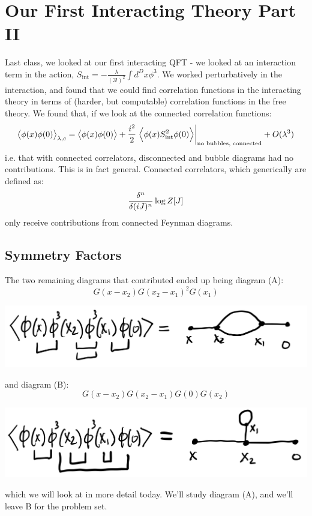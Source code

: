 \section{Our First Interacting Theory Part II}
Last class, we looked at our first interacting QFT - we looked at an interaction term in the action, $S_{\text{int}} = -\frac{\lambda}{(3!)^2}\int d^D x \phi^3$. We worked perturbatively in the interaction, and found that we could find correlation functions in the interacting theory in terms of (harder, but computable) correlation functions in the free theory. We found that, if we look at the connected correlation functions:
\begin{equation}
    \left< \phi(x)\phi(0) \right>_{\lambda, c} = \left< \phi(x)\phi(0) \right> + \frac{i^2}{2}\left.\left< \phi(x)S_{\text{int}}^2\phi(0) \right>\right|_{\text{no bubbles, connected}} + O(\lambda^3)
\end{equation}
i.e. that with connected correlators, disconnected and bubble diagrams had no contributions. This is in fact general. Connected correlators, which generically are defined as:
\begin{equation}
    \frac{\delta ^n}{\delta (iJ)^n}\log Z[J]
\end{equation}
only receive contributions from connected Feynman diagrams.

\subsection{Symmetry Factors}
The two remaining diagrams that contributed ended up being diagram (A):
\begin{equation}
    G(x - x_2)G(x_2 - x_1)^2 G(x_1)
\end{equation}
\begin{center}
    \includegraphics[scale=0.4]{Lectures/Figures/lec11-diag3.png}
\end{center}
and diagram (B):
\begin{equation}
    G(x - x_2)G(x_2 - x_1)G(0)G(x_2)
\end{equation}
\begin{center}
    \includegraphics[scale=0.4]{Lectures/Figures/lec11-diag4.png}
\end{center}
which we will look at in more detail today. We'll study diagram (A), and we'll leave B for the problem set.


